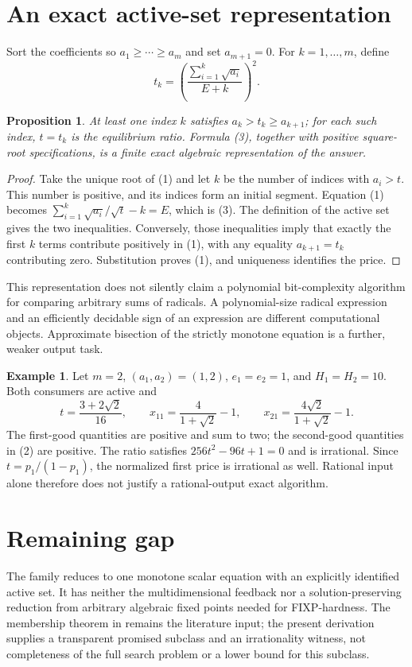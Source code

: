 \documentclass[11pt]{article}
\newtheorem{proposition}[theorem]{Proposition}
\theoremstyle{definition}
\newtheorem{example}[theorem]{Example}
\begin{document}
\section*{An exact active-set representation}
Sort the coefficients so $a_1\ge\cdots\ge a_m$ and set $a_{m+1}=0$.
For $k=1,\ldots,m$, define
\[
 t_k=\left(\frac{\sum_{i=1}^k\sqrt{a_i}}{E+k}\right)^2.   \tag{3}
\]
\begin{proposition}
At least one index $k$ satisfies $a_k>t_k\ge a_{k+1}$; for each such
index, $t=t_k$ is the equilibrium ratio. Formula (3), together with
positive square-root specifications, is a finite exact algebraic
representation of the answer.
\end{proposition}
\begin{proof}
Take the unique root of (1) and let $k$ be the number of indices with
$a_i>t$. This number is positive, and its indices form an initial segment.
Equation (1) becomes
$\sum_{i=1}^k\sqrt{a_i}/\sqrt t-k=E$, which is (3).
The definition of the active set gives the two inequalities. Conversely,
those inequalities imply that exactly the first $k$ terms contribute
positively in (1), with any equality $a_{k+1}=t_k$ contributing zero.
Substitution proves (1), and uniqueness identifies the price.
\end{proof}
This representation does not silently claim a polynomial bit-complexity
algorithm for comparing arbitrary sums of radicals. A polynomial-size
radical expression and an efficiently decidable sign of an expression are
different computational objects. Approximate bisection of the strictly
monotone equation is a further, weaker output task.

\begin{example}
Let $m=2$, $(a_1,a_2)=(1,2)$, $e_1=e_2=1$, and $H_1=H_2=10$.
Both consumers are active and
\[
 t=\frac{3+2\sqrt2}{16},\qquad
 x_{11}=\frac4{1+\sqrt2}-1,\qquad
 x_{21}=\frac{4\sqrt2}{1+\sqrt2}-1.
\]
The first-good quantities are positive and sum to two; the second-good
quantities in (2) are positive. The ratio satisfies
$256t^2-96t+1=0$ and is irrational. Since $t=p_1/(1-p_1)$,
the normalized first price is irrational as well. Rational input alone
therefore does not justify a rational-output exact algorithm.
\end{example}

\section*{Remaining gap}
The family reduces to one monotone scalar equation with an explicitly
identified active set. It has neither the multidimensional feedback nor
a solution-preserving reduction from arbitrary algebraic fixed points
needed for FIXP-hardness. The membership theorem in \cite{fixp} remains
the literature input; the present derivation supplies a transparent
promised subclass and an irrationality witness, not completeness of the
full search problem or a lower bound for this subclass.
\end{document}
